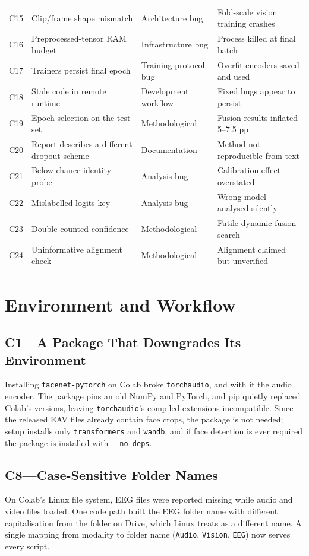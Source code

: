 \begin{table}[htbp]
\begin{tabular}{p{1.0cm} p{4.7cm} p{3.2cm} p{4.2cm}}
C15 & Clip/frame shape mismatch & Architecture bug & Fold-scale vision training crashes \\
C16 & Preprocessed-tensor RAM budget & Infrastructure bug & Process killed at final batch \\
C17 & Trainers persist final epoch & Training protocol bug & Overfit encoders saved and used \\
C18 & Stale code in remote runtime & Development workflow & Fixed bugs appear to persist \\
C19 & Epoch selection on the test set & Methodological & Fusion results inflated 5--7.5 pp \\
C20 & Report describes a different dropout scheme & Documentation & Method not reproducible from text \\
C21 & Below-chance identity probe & Analysis bug & Calibration effect overstated \\
C22 & Mislabelled logits key & Analysis bug & Wrong model analysed silently \\
C23 & Double-counted confidence & Methodological & Futile dynamic-fusion search \\
C24 & Uninformative alignment check & Methodological & Alignment claimed but unverified \\
\hline
\end{tabular}
\end{table}

\section{Environment and Workflow}

\subsection*{C1---A Package That Downgrades Its Environment}
Installing \texttt{facenet-pytorch} on Colab broke \texttt{torchaudio}, and with it the audio encoder. The package pins an old NumPy and PyTorch, and pip quietly replaced Colab's versions, leaving \texttt{torchaudio}'s compiled extensions incompatible. Since the released EAV files already contain face crops, the package is not needed; setup installs only \texttt{transformers} and \texttt{wandb}, and if face detection is ever required the package is installed with \texttt{-{}-no-deps}.

\subsection*{C8---Case-Sensitive Folder Names}
On Colab's Linux file system, EEG files were reported missing while audio and video files loaded. One code path built the EEG folder name with different capitalisation from the folder on Drive, which Linux treats as a different name. A single mapping from modality to folder name (\texttt{Audio}, \texttt{Vision}, \texttt{EEG}) now serves every script.

